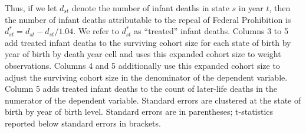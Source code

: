 \documentclass[12pt]{article}
\begin{document}
\begin{table}[!ht]
\begin{adjustbox}{width=1.0\textwidth}
\begin{threeparttable}
{            Thus, if we let $d_{st}$ denote the number of infant deaths in state $s$ in year $t$, then the number of infant deaths attributable to the repeal of Federal Prohibition is $d^*_{st} = d_{st} - d_{st}/1.04$. 
            We refer to $d^*_{st}$ as ``treated'' infant deaths. 
            Columns 3 to 5 add treated infant deaths to the surviving cohort size for each state of birth by year of birth by death year cell and uses this expanded cohort size to weight observations.
            Columns 4 and 5 additionally use this expanded cohort size to adjust the surviving cohort size in the denominator of the dependent variable.
            Column 5 adds treated infant deaths to the count of later-life deaths in the numerator of the dependent variable. 
            Standard errors are clustered at the state of birth by year of birth level. 
            Standard errors are in parentheses; t-statistics reported below standard errors in brackets.
          }
      \end{threeparttable}
     \end{adjustbox}
\end{table}
\end{document}
